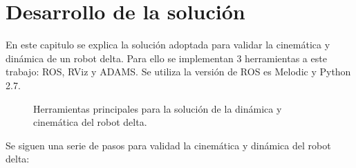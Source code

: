 \chapter{Desarrollo de la solución}\label{CAP6}
    
    
    En este capitulo se explica la solución adoptada para validar la cinemática y dinámica de un robot delta. Para ello se implementan 3 herramientas a este trabajo: ROS, RViz y ADAMS. Se utiliza la versión de ROS es Melodic y Python 2.7.
    
    \begin{figure}[h]
        \centering
        \caption{Herramientas principales para la solución de la dinámica y cinemática del robot delta.}
        \label{fig:cap6_intro_1}
    \end{figure}

    Se siguen una serie de pasos para validad la cinemática y dinámica del robot delta:
    
